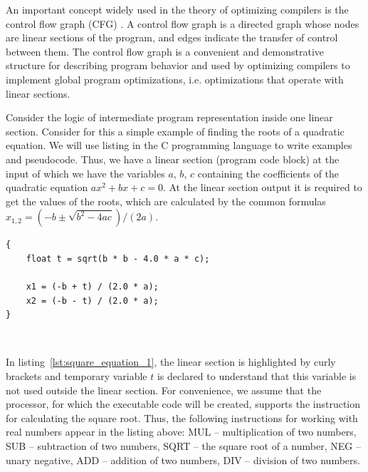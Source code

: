 \documentclass[
11pt,%
tightenlines,%
twoside,%
onecolumn,%
nofloats,%
nobibnotes,%
nofootinbib,%
superscriptaddress,%
noshowpacs,%
centertags]%
{revtex4}
\begin{document}
An important concept widely used in the theory of optimizing compilers is the control flow graph (CFG) \cite{Muchnick}.
A control flow graph is a directed graph whose nodes are linear sections of the program, and edges indicate the transfer of control between them.
The control flow graph is a convenient and demonstrative structure for describing program behavior and used by optimizing compilers to implement global program optimizations, i.e. optimizations that operate with linear sections.

Consider the logic of intermediate program representation inside one linear section.
Consider for this a simple example of finding the roots of a quadratic equation.
We will use listing in the C programming language to write examples and pseudocode.
Thus, we have a linear section (program code block) at the input of which we have the variables $a$, $b$, $c$ containing the coefficients of the quadratic equation $ax^2 + bx + c = 0$.
At the linear section output it is required to get the values of the roots, which are calculated by the common formulas $x_{1,2} = (-b \pm \sqrt{b^2 - 4ac})/(2a)$.

\begin{lstlisting}[caption={Code block for calculating the roots of quadratic equation.},label={lst:square_equation_1}]
{
    float t = sqrt(b * b - 4.0 * a * c);
    
    x1 = (-b + t) / (2.0 * a);
    x2 = (-b - t) / (2.0 * a);
}
\end{lstlisting}

\

In listing~\ref{lst:square_equation_1}, the linear section is highlighted by curly brackets and temporary variable $t$ is declared to understand that this variable is not used outside the linear section.
For convenience, we assume that the processor, for which the executable code will be created, supports the instruction for calculating the square root.
Thus, the following instructions for working with real numbers appear in the listing above: MUL -- multiplication of two numbers, SUB -- subtraction of two numbers, SQRT -- the square root of a number, NEG -- unary negative, ADD -- addition of two numbers, DIV -- division of two numbers.
\end{document}
